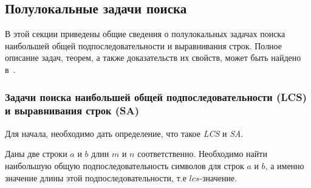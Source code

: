 



\subsection{Полулокальные задачи поиска}

В этой секции приведены общие сведения о полулокальных задачах поиска наибольшей общей подпоследовательности и выравнивания строк.
Полное описание задач, теорем, а также доказательств их свойств, может быть найдено в~\cite{alex2007semilocal}.

\subsubsection{Задачи поиска наибольшей общей подпоследовательности (LCS) и выравнивания строк (SA)}\mbox{}

Для начала, необходимо дать определение, что такое \emph{LCS} и \emph{SA}.

\begin{definition}
Даны две строки $a$ и $b$ длин $m$ и $n$ соответственно.
Необходимо найти наибольшую общую подпоследовательность символов для строк $a$ и $b$, а именно значение длины этой подпоследовательности, т.е $lcs$-значение.
\end{definition}

